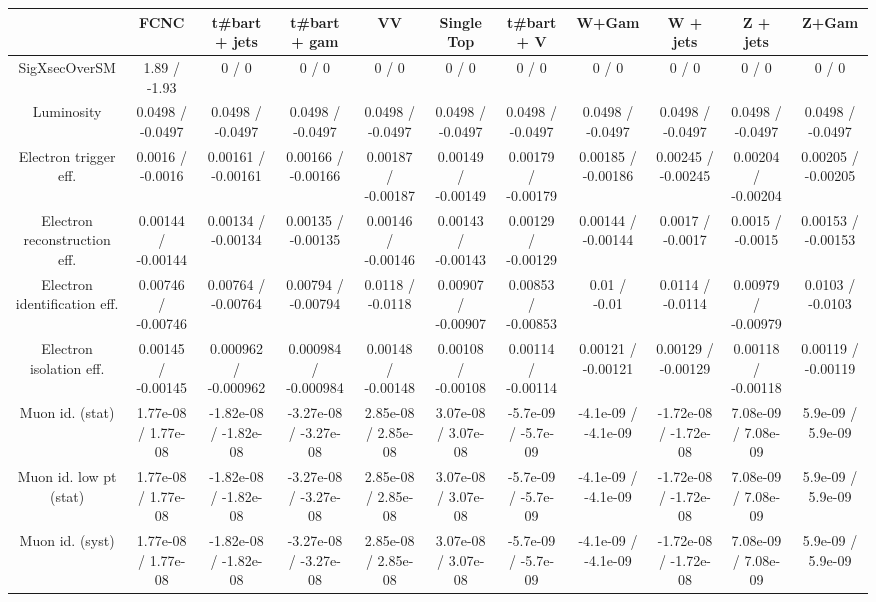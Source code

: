 \begin{table}[htbp]
\begin{center}
\footnotesize
\begin{tabular}{|c|c|c|c|c|c|c|c|c|c|c|}
\hline 
      & FCNC      & t#bar{t} + jets      & t#bar{t} +  gam      & VV      & Single Top      & t#bar{t} + V      & W+Gam      & W + jets      & Z + jets      & Z+Gam \\ 
\hline 
 SigXsecOverSM & 1.89 / -1.93 & 0 / 0 & 0 / 0 & 0 / 0 & 0 / 0 & 0 / 0 & 0 / 0 & 0 / 0 & 0 / 0 & 0 / 0 \\ 
  Luminosity & 0.0498 / -0.0497 & 0.0498 / -0.0497 & 0.0498 / -0.0497 & 0.0498 / -0.0497 & 0.0498 / -0.0497 & 0.0498 / -0.0497 & 0.0498 / -0.0497 & 0.0498 / -0.0497 & 0.0498 / -0.0497 & 0.0498 / -0.0497 \\ 
  Electron trigger eff. & 0.0016 / -0.0016 & 0.00161 / -0.00161 & 0.00166 / -0.00166 & 0.00187 / -0.00187 & 0.00149 / -0.00149 & 0.00179 / -0.00179 & 0.00185 / -0.00186 & 0.00245 / -0.00245 & 0.00204 / -0.00204 & 0.00205 / -0.00205 \\ 
  Electron reconstruction eff. & 0.00144 / -0.00144 & 0.00134 / -0.00134 & 0.00135 / -0.00135 & 0.00146 / -0.00146 & 0.00143 / -0.00143 & 0.00129 / -0.00129 & 0.00144 / -0.00144 & 0.0017 / -0.0017 & 0.0015 / -0.0015 & 0.00153 / -0.00153 \\ 
  Electron identification eff. & 0.00746 / -0.00746 & 0.00764 / -0.00764 & 0.00794 / -0.00794 & 0.0118 / -0.0118 & 0.00907 / -0.00907 & 0.00853 / -0.00853 & 0.01 / -0.01 & 0.0114 / -0.0114 & 0.00979 / -0.00979 & 0.0103 / -0.0103 \\ 
  Electron isolation eff. & 0.00145 / -0.00145 & 0.000962 / -0.000962 & 0.000984 / -0.000984 & 0.00148 / -0.00148 & 0.00108 / -0.00108 & 0.00114 / -0.00114 & 0.00121 / -0.00121 & 0.00129 / -0.00129 & 0.00118 / -0.00118 & 0.00119 / -0.00119 \\ 
  Muon id. (stat) & 1.77e-08 / 1.77e-08 & -1.82e-08 / -1.82e-08 & -3.27e-08 / -3.27e-08 & 2.85e-08 / 2.85e-08 & 3.07e-08 / 3.07e-08 & -5.7e-09 / -5.7e-09 & -4.1e-09 / -4.1e-09 & -1.72e-08 / -1.72e-08 & 7.08e-09 / 7.08e-09 & 5.9e-09 / 5.9e-09 \\ 
  Muon id. low pt (stat) & 1.77e-08 / 1.77e-08 & -1.82e-08 / -1.82e-08 & -3.27e-08 / -3.27e-08 & 2.85e-08 / 2.85e-08 & 3.07e-08 / 3.07e-08 & -5.7e-09 / -5.7e-09 & -4.1e-09 / -4.1e-09 & -1.72e-08 / -1.72e-08 & 7.08e-09 / 7.08e-09 & 5.9e-09 / 5.9e-09 \\ 
  Muon id. (syst) & 1.77e-08 / 1.77e-08 & -1.82e-08 / -1.82e-08 & -3.27e-08 / -3.27e-08 & 2.85e-08 / 2.85e-08 & 3.07e-08 / 3.07e-08 & -5.7e-09 / -5.7e-09 & -4.1e-09 / -4.1e-09 & -1.72e-08 / -1.72e-08 & 7.08e-09 / 7.08e-09 & 5.9e-09 / 5.9e-09 \\ 

\end{tabular}
\end{center}
\end{table}
